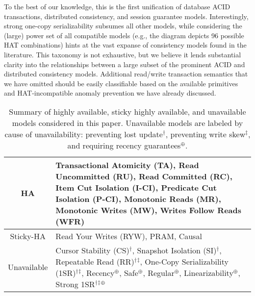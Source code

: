 To the best of our knowledge, this is the first unification of
database ACID transactions, distributed consistency, and session
guarantee models. Interestingly, strong one-copy serializability
subsumes all other models, while considering the (large) power set of
all compatible models (e.g., the diagram depicts 96 possible HAT
combinations) hints at the vast expanse of consistency models found in
the literature. This taxonomy is not exhaustive, but we believe it
lends substantial clarity into the relationships between a large
subset of the prominent ACID and distributed consistency
models. Additional read/write transaction semantics that we have
omitted should be easily classifiable based on the available
primitives and HAT-incompatible anomaly prevention we have already
discussed.

 \newcommand{\lostupdate}{$^\dagger$}
 \newcommand{\rwskew}{$^\ddagger$}
 \newcommand{\linearizable}{$^\oplus$}

\begin{table}[t!]
\begin{tabular}{| c | p{6cm} | }\hline
HA & Transactional Atomicity (TA), Read Uncommitted (RU), Read
Committed (RC), Item Cut Isolation (I-CI), Predicate Cut Isolation
(P-CI), Monotonic Reads (MR), Monotonic Writes (MW), Writes Follow
Reads (WFR)\\\hline Sticky-HA & Read Your Writes (RYW), PRAM,
Causal\\\hline Unavailable & Cursor Stability (CS)\lostupdate,
Snapshot Isolation (SI)\lostupdate, Repeatable Read
(RR)\lostupdate\rwskew, One-Copy Serializability
(1SR)\lostupdate\rwskew, Recency\linearizable, Safe\linearizable,
Regular\linearizable, Linearizability\linearizable, Strong
1SR\lostupdate\rwskew\linearizable \\\hline
\end{tabular}
\caption{Summary of highly available, sticky highly available, and
  unavailable models considered in this paper. Unavailable models are
  labeled by cause of unavailability: preventing lost
  update\lostupdate, preventing write skew\rwskew, and requiring
  recency guarantees\linearizable.}\vspace{-.5em}
\label{table:hatcompared}
\end{table}

